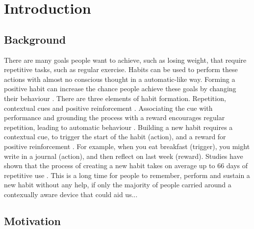 
\section{Introduction}

\subsection*{Background}
There are many goals people want to achieve, such as losing weight, that require repetitive tasks, such as regular exercise. Habits can be used to perform these actions with almost no conscious thought in a automatic-like way. Forming a positive habit can increase the chance people achieve these goals by changing their behaviour \cite{article_promoting_habit_formation}. There are three elements of habit formation. Repetition, contextual cues and positive reinforcement \cite{article_beyond_self_tracking_designing_apps}. Associating the cue with performance and grounding the process with a reward encourages regular repetition, leading to automatic behaviour \cite{article_experiences_of_habit_formation}. Building a new habit requires a contextual cue, to trigger the start of the habit (action), and a reward for positive reinforcement \cite{article_beyond_self_tracking_designing_apps}. For example, when you eat breakfast (trigger), you might write in a journal (action), and then reflect on last week (reward). Studies have shown that the process of creating a new habit takes on average up to 66 days of repetitive use \cite{article_how_habits_formed_modelling_habit_formation}. This is a long time for people to remember, perform and sustain a new habit without any help, if only the majority of people carried around a contexually aware device that could aid us...

\subsection*{Motivation}

